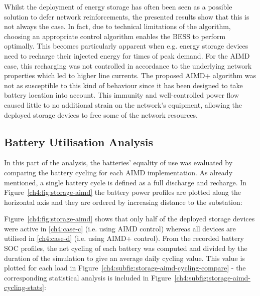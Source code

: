 Whilst the deployment of energy storage has often been seen as a possible solution to defer network reinforcements, the presented results show that this is not always the case.
In fact, due to technical limitations of the algorithm, choosing an appropriate control algorithm enables the BESS to perform optimally.
This becomes particularly apparent when e.g. energy storage devices need to recharge their injected energy for times of peak demand.
For the AIMD case, this recharging was not controlled in accordance to the underlying network properties which led to higher line currents.
The proposed AIMD+ algorithm was not as susceptible to this kind of behaviour since it has been designed to take battery location into account.
This immunity and well-controlled power flow caused little to no additional strain on the network's equipment, allowing the deployed storage devices to free some of the network resources.

\subsection{Battery Utilisation Analysis}

In this part of the analysis, the batteries' equality of use was evaluated by comparing the battery cycling for each AIMD implementation.
As already mentioned, a single battery cycle is defined as a full discharge and recharge.
In Figure~\ref{ch4:fig:storage-aimd} the battery power profiles are plotted along the horizontal axis and they are ordered by increasing distance to the substation:



Figure~\ref{ch4:fig:storage-aimd} shows that only half of the deployed storage devices were active in \ref{ch4:case-c} (i.e. using AIMD control) whereas all devices are utilised in \ref{ch4:case-d} (i.e. using AIMD+ control).
From the recorded battery SOC profiles, the net cycling of each battery was computed and divided by the duration of the simulation to give an average daily cycling value.
This value is plotted for each load in Figure~\ref{ch4:subfig:storage-aimd-cycling-compare} - the corresponding statistical analysis is included in Figure~\ref{ch4:subfig:storage-aimd-cycling-stats}:




